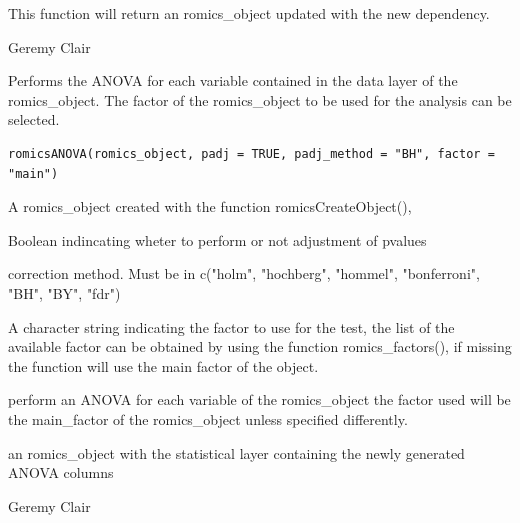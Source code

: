 \documentclass[a4paper]{book}
\begin{document}
%
\begin{Value}
This function will return an romics\_object updated with the new dependency.
\end{Value}
%
\begin{Author}
Geremy Clair
\end{Author}
%
\begin{Description}
Performs the ANOVA for each variable contained in the data layer of the romics\_object. The factor of the romics\_object to be used for the analysis can be selected.
\end{Description}
%
\begin{Usage}
\begin{verbatim}
romicsANOVA(romics_object, padj = TRUE, padj_method = "BH", factor = "main")
\end{verbatim}
\end{Usage}
%
\begin{Arguments}
\begin{ldescription}
\item[\code{romics\_object}] A romics\_object created with the function romicsCreateObject(),

\item[\code{padj}] Boolean indincating wheter to perform or not adjustment of pvalues

\item[\code{padj\_method}] correction method. Must be in  c("holm", "hochberg", "hommel", "bonferroni", "BH", "BY", "fdr")

\item[\code{factor}] A character string indicating the factor to use for the test, the list of the available factor can be obtained by using the function romics\_factors(), if missing the function will use the main factor of the object.
\end{ldescription}
\end{Arguments}
%
\begin{Details}
perform an ANOVA for each variable of the romics\_object the factor used will be the main\_factor of the romics\_object unless specified differently.
\end{Details}
%
\begin{Value}
an romics\_object with the statistical layer containing the newly generated ANOVA columns
\end{Value}
%
\begin{Author}
Geremy Clair
\end{Author}
\end{document}
